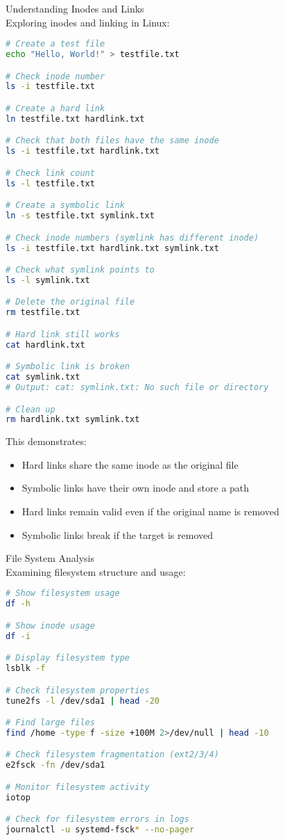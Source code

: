 \begin{example2}{Understanding Inodes and Links}\\
    Exploring inodes and linking in Linux:
    
\begin{lstlisting}[language=bash, style=basesmol]
# Create a test file
echo "Hello, World!" > testfile.txt

# Check inode number
ls -i testfile.txt

# Create a hard link
ln testfile.txt hardlink.txt

# Check that both files have the same inode
ls -i testfile.txt hardlink.txt

# Check link count
ls -l testfile.txt

# Create a symbolic link
ln -s testfile.txt symlink.txt

# Check inode numbers (symlink has different inode)
ls -i testfile.txt hardlink.txt symlink.txt

# Check what symlink points to
ls -l symlink.txt

# Delete the original file
rm testfile.txt

# Hard link still works
cat hardlink.txt

# Symbolic link is broken
cat symlink.txt
# Output: cat: symlink.txt: No such file or directory

# Clean up
rm hardlink.txt symlink.txt
\end{lstlisting}

    This demonstrates:
    \begin{itemize}
        \item Hard links share the same inode as the original file
        \item Symbolic links have their own inode and store a path
        \item Hard links remain valid even if the original name is removed
        \item Symbolic links break if the target is removed
    \end{itemize}
\end{example2}

\begin{example2}{File System Analysis}\\
    Examining filesystem structure and usage:
    
\begin{lstlisting}[language=bash, style=basesmol]
# Show filesystem usage
df -h

# Show inode usage
df -i

# Display filesystem type
lsblk -f

# Check filesystem properties
tune2fs -l /dev/sda1 | head -20

# Find large files
find /home -type f -size +100M 2>/dev/null | head -10

# Check filesystem fragmentation (ext2/3/4)
e2fsck -fn /dev/sda1

# Monitor filesystem activity
iotop

# Check for filesystem errors in logs
journalctl -u systemd-fsck* --no-pager
\end{lstlisting}
\end{example2}